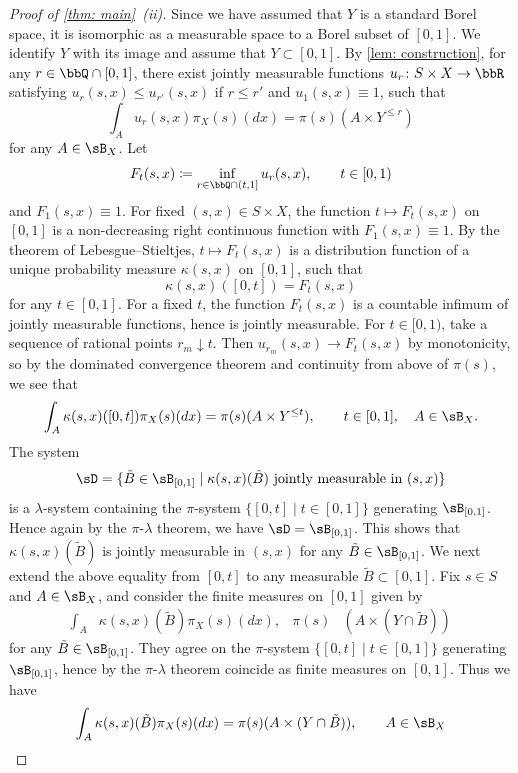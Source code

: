 \documentclass[12pt,reqno]{amsart}%
\theoremstyle{plain}
\theoremstyle{definition}
\def\R{\bbR}
\begin{document}
\begin{proof}[Proof of \cref{thm: main}~\textit{(ii)}]
	Since we have assumed that $Y$ is a standard Borel space, it is isomorphic as a measurable space to a Borel subset of $[0,1]$.
	We identify $Y$ with its image and assume that $Y\subset[0,1]$.
	By \cref{lem: construction}, for any $r\in\bbQ\cap[0,1]$, there exist
	jointly measurable functions $u_r\colon S\times X\rightarrow\R$
	satisfying $u_r(s,x)\leq u_{r'}(s,x)$ if $r\leq r'$ and $u_1(s,x)\equiv 1$,
	such that
	\[
		\int_A u_r(s,x) \pi_X(s)(dx)=\pi(s)(A\times Y^{\leq r})
	\]
	for any $A\in\sB_X$.
	Let
	\[
		F_t(s,x)\coloneqq\inf_{r\in\bbQ\cap(t,1]} u_r(s,x),\qquad t\in[0,1)
	\]
	and $F_1(s,x)\equiv 1$.  For fixed $(s,x)\in S\times X$, the function $t\mapsto F_t(s,x)$ on
	$[0,1]$ is a non-decreasing right continuous function with $F_1(s,x)\equiv1$.
	By the theorem of Lebesgue--Stieltjes, $t\mapsto F_t(s,x)$ is a distribution function of a unique
	probability measure $\kappa(s,x)$ on $[0,1]$, such that
	\[
		\kappa(s,x)([0,t])=F_t(s,x)
	\]
	for any $t\in[0,1]$.  For a fixed $t$, the function $F_t(s,x)$ is a countable infimum
	of jointly measurable functions, hence is jointly measurable.
	For $t\in[0,1)$, take a sequence of rational points $r_m\downarrow t$.
	Then $u_{r_m}(s,x)\rightarrow F_t(s,x)$ by monotonicity, so by the dominated convergence theorem
	and continuity from above of $\pi(s)$, we see that
	\[
		\int_A \kappa(s,x)([0,t])\pi_X(s)(dx)=\pi(s)(A\times Y^{\leq t}),\qquad t\in[0,1], \quad A\in\sB_X.
	\]
	The system
	\[
		\sD=\{\tilde B\in \sB_{[0,1]}\mid \text{$\kappa(s,x)(\tilde B)$ jointly measurable in $(s,x)$}\}
	\]
	is a $\lambda$-system containing  the $\pi$-system $\{[0,t]\mid t\in[0,1]\}$ generating $\sB_{[0,1]}$.
	  Hence again by the  $\pi$-$\lambda$ theorem, we have $\sD=\sB_{[0,1]}$.
	This shows that $\kappa(s,x)(\tilde B)$ is jointly measurable in $(s,x)$ for any $\tilde B\in\sB_{[0,1]}$.
	We next extend the above equality from $[0,t]$ to any measurable $\tilde B\subset[0,1]$.
	Fix $s\in S$ and $A\in\sB_X$, and consider the finite measures on $[0,1]$ given by
	\begin{align*}
		\int_A&\kappa(s,x)(\tilde B)\pi_X(s)(dx),&
		\pi(s)&(A\times(Y\cap \tilde B))
	\end{align*}
	for any $\tilde B\in\sB_{[0,1]}$.
	They agree on the $\pi$-system $\{[0,t]\mid t\in[0,1]\}$ generating $\sB_{[0,1]}$,
	hence by the $\pi$-$\lambda$ theorem coincide as finite measures on $[0,1]$.
	Thus we have
	\[
		\int_A \kappa(s,x)(\tilde B)\pi_X(s)(dx)=\pi(s)(A\times(Y\cap\tilde B)),\qquad A\in\sB_X
\]
\end{proof}
\end{document}
